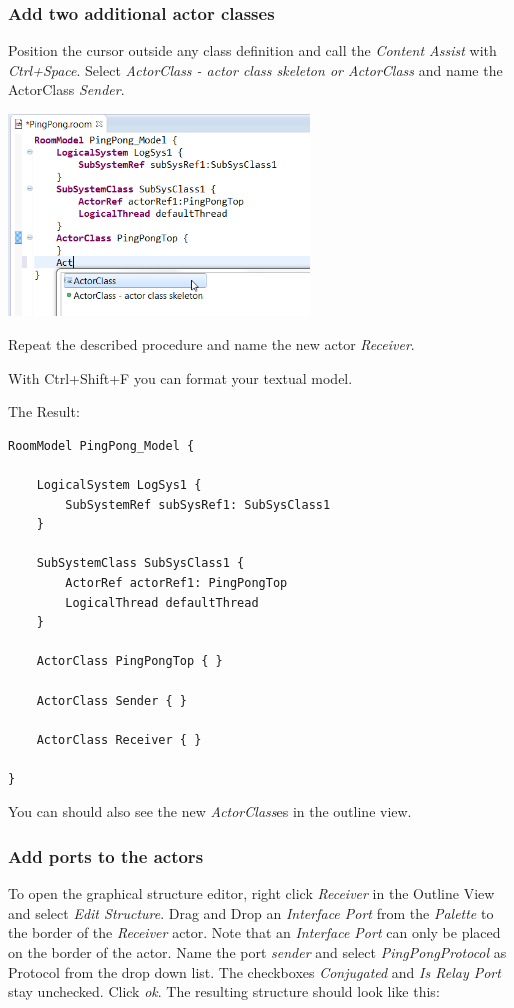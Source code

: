 \subsubsection*{Add two additional actor classes}

Position the cursor outside any class definition and call the \textit{Content Assist} with \emph{Ctrl+Space}.
Select \textit{ActorClass - actor class skeleton or ActorClass} and name the ActorClass \textit{Sender}.

\includegraphics[width=0.6\textwidth]{images/017-02-content-assist.png}

Repeat the described procedure and name the new actor \textit{Receiver}.

With Ctrl+Shift+F you can format your textual model. 

The Result:

\begin{lstlisting}[language=ROOM]
RoomModel PingPong_Model {

	LogicalSystem LogSys1 {
		SubSystemRef subSysRef1: SubSysClass1
	}

	SubSystemClass SubSysClass1 {
		ActorRef actorRef1: PingPongTop
		LogicalThread defaultThread
	}

	ActorClass PingPongTop { }

	ActorClass Sender { }

	ActorClass Receiver { }

}
\end{lstlisting}

You can should also see the new \emph{ActorClass}es in the outline view.

\subsubsection*{Add ports to the actors}

To open the graphical structure editor, right click \textit{Receiver} in the Outline View and select \textit{Edit Structure}. Drag and Drop an 
\textit{Interface Port} from the \emph{Palette} to the border of the \textit{Receiver} actor. Note that an \emph{Interface Port} can only be placed on the border of the actor. Name the port \textit{sender} and select \textit{PingPongProtocol} as Protocol from the drop down list. The checkboxes \textit{Conjugated} and \textit{Is Relay Port} stay unchecked. Click \textit{ok}. The 
resulting structure should look like this:

